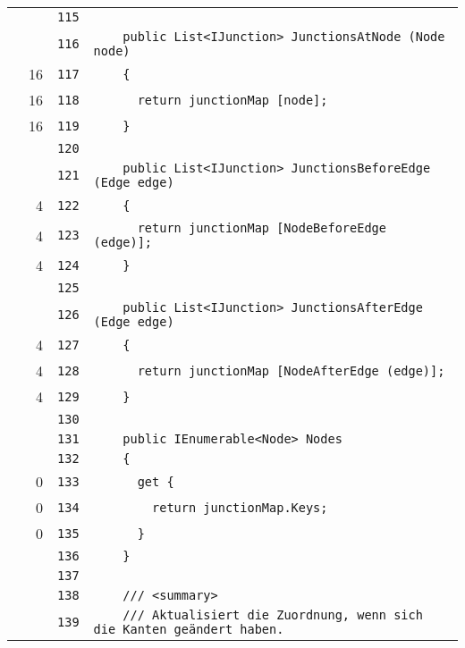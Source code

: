 \documentclass[a4paper,10pt]{article}
\begin{document}
\begin{longtable}[l]{lrrl}
\cellcolor{gray} &  & \verb~115~ & \verb~~\\
\cellcolor{gray} &  & \verb~116~ & \verb~    public List<IJunction> JunctionsAtNode (Node node)~\\
\cellcolor{green} & 16 & \verb~117~ & \verb~    {~\\
\cellcolor{green} & 16 & \verb~118~ & \verb~      return junctionMap [node];~\\
\cellcolor{green} & 16 & \verb~119~ & \verb~    }~\\
\cellcolor{gray} &  & \verb~120~ & \verb~~\\
\cellcolor{gray} &  & \verb~121~ & \verb~    public List<IJunction> JunctionsBeforeEdge (Edge edge)~\\
\cellcolor{green} & 4 & \verb~122~ & \verb~    {~\\
\cellcolor{green} & 4 & \verb~123~ & \verb~      return junctionMap [NodeBeforeEdge (edge)];~\\
\cellcolor{green} & 4 & \verb~124~ & \verb~    }~\\
\cellcolor{gray} &  & \verb~125~ & \verb~~\\
\cellcolor{gray} &  & \verb~126~ & \verb~    public List<IJunction> JunctionsAfterEdge (Edge edge)~\\
\cellcolor{green} & 4 & \verb~127~ & \verb~    {~\\
\cellcolor{green} & 4 & \verb~128~ & \verb~      return junctionMap [NodeAfterEdge (edge)];~\\
\cellcolor{green} & 4 & \verb~129~ & \verb~    }~\\
\cellcolor{gray} &  & \verb~130~ & \verb~~\\
\cellcolor{gray} &  & \verb~131~ & \verb~    public IEnumerable<Node> Nodes~\\
\cellcolor{gray} &  & \verb~132~ & \verb~    {~\\
\cellcolor{red} & 0 & \verb~133~ & \verb~      get {~\\
\cellcolor{red} & 0 & \verb~134~ & \verb~        return junctionMap.Keys;~\\
\cellcolor{red} & 0 & \verb~135~ & \verb~      }~\\
\cellcolor{gray} &  & \verb~136~ & \verb~    }~\\
\cellcolor{gray} &  & \verb~137~ & \verb~~\\
\cellcolor{gray} &  & \verb~138~ & \verb~    /// <summary>~\\
\cellcolor{gray} &  & \verb~139~ & \verb~    /// Aktualisiert die Zuordnung, wenn sich die Kanten geändert haben.~\\

\end{longtable}
\end{document}
